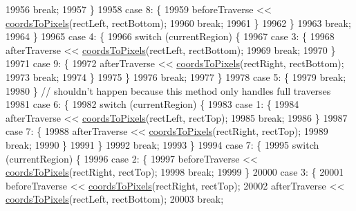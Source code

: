 \begin{DoxyCode}
19956       \textcolor{keywordflow}{break};
19957     \}
19958     \textcolor{keywordflow}{case} 8: \{
19959       beforeTraverse << \hyperlink{class_q_c_p_abstract_plottable_ade710a776104b14c1c835168ce1bfc5c}{coordsToPixels}(rectLeft, rectBottom);
19960       \textcolor{keywordflow}{break};
19961     \}
19962     \}
19963     \textcolor{keywordflow}{break};
19964   \}
19965   \textcolor{keywordflow}{case} 4: \{
19966     \textcolor{keywordflow}{switch} (currentRegion) \{
19967     \textcolor{keywordflow}{case} 3: \{
19968       afterTraverse << \hyperlink{class_q_c_p_abstract_plottable_ade710a776104b14c1c835168ce1bfc5c}{coordsToPixels}(rectLeft, rectBottom);
19969       \textcolor{keywordflow}{break};
19970     \}
19971     \textcolor{keywordflow}{case} 9: \{
19972       afterTraverse << \hyperlink{class_q_c_p_abstract_plottable_ade710a776104b14c1c835168ce1bfc5c}{coordsToPixels}(rectRight, rectBottom);
19973       \textcolor{keywordflow}{break};
19974     \}
19975     \}
19976     \textcolor{keywordflow}{break};
19977   \}
19978   \textcolor{keywordflow}{case} 5: \{
19979     \textcolor{keywordflow}{break};
19980   \} \textcolor{comment}{// shouldn't happen because this method only handles full traverses}
19981   \textcolor{keywordflow}{case} 6: \{
19982     \textcolor{keywordflow}{switch} (currentRegion) \{
19983     \textcolor{keywordflow}{case} 1: \{
19984       afterTraverse << \hyperlink{class_q_c_p_abstract_plottable_ade710a776104b14c1c835168ce1bfc5c}{coordsToPixels}(rectLeft, rectTop);
19985       \textcolor{keywordflow}{break};
19986     \}
19987     \textcolor{keywordflow}{case} 7: \{
19988       afterTraverse << \hyperlink{class_q_c_p_abstract_plottable_ade710a776104b14c1c835168ce1bfc5c}{coordsToPixels}(rectRight, rectTop);
19989       \textcolor{keywordflow}{break};
19990     \}
19991     \}
19992     \textcolor{keywordflow}{break};
19993   \}
19994   \textcolor{keywordflow}{case} 7: \{
19995     \textcolor{keywordflow}{switch} (currentRegion) \{
19996     \textcolor{keywordflow}{case} 2: \{
19997       beforeTraverse << \hyperlink{class_q_c_p_abstract_plottable_ade710a776104b14c1c835168ce1bfc5c}{coordsToPixels}(rectRight, rectTop);
19998       \textcolor{keywordflow}{break};
19999     \}
20000     \textcolor{keywordflow}{case} 3: \{
20001       beforeTraverse << \hyperlink{class_q_c_p_abstract_plottable_ade710a776104b14c1c835168ce1bfc5c}{coordsToPixels}(rectRight, rectTop);
20002       afterTraverse << \hyperlink{class_q_c_p_abstract_plottable_ade710a776104b14c1c835168ce1bfc5c}{coordsToPixels}(rectLeft, rectBottom);
20003       \textcolor{keywordflow}{break};

\end{DoxyCode}
